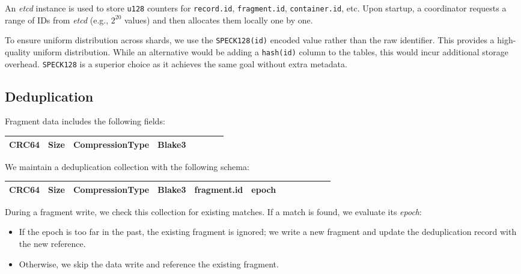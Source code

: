 \documentclass[a4paper,12pt]{article}
\begin{document}
    An \textit{etcd} instance is used to store \texttt{u128} counters for \texttt{record.id}, \texttt{fragment.id}, \texttt{container.id}, etc. Upon startup, a coordinator requests a range of IDs from \textit{etcd} (e.g., $2^{20}$ values) and then allocates them locally one by one.

    To ensure uniform distribution across shards, we use the \texttt{SPECK128(id)} encoded value rather than the raw identifier. This provides a high-quality uniform distribution. While an alternative would be adding a \texttt{hash(id)} column to the tables, this would incur additional storage overhead. \texttt{SPECK128} is a superior choice as it achieves the same goal without extra metadata.

    \subsection{Deduplication}

    Fragment data includes the following fields:

    \begin{center}
        \begin{tabular}{|Sl|Sc|Sc|Sr|}
            \hline
            CRC64 & Size & CompressionType & Blake3 \\
            \hline
        \end{tabular}
    \end{center}

    \bigskip
    We maintain a deduplication collection with the following schema:

    \begin{center}
        \begin{tabular}{|Sl|Sc|Sc|Sc|Sc|Sr|}
            \hline
            CRC64 & Size & CompressionType & Blake3 & fragment.id & epoch \\
            \hline
        \end{tabular}
    \end{center}

    \bigskip
    During a fragment write, we check this collection for existing matches. If a match is found, we evaluate its \textit{epoch}:

    \begin{itemize}
        \item If the epoch is too far in the past, the existing fragment is ignored; we write a new fragment and update the deduplication record with the new reference.
        \item Otherwise, we skip the data write and reference the existing fragment.
    \end{itemize}
\end{document}
